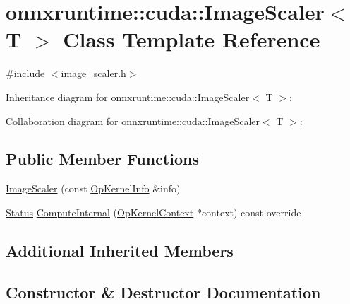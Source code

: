 \hypertarget{classonnxruntime_1_1cuda_1_1ImageScaler}{}\section{onnxruntime\+:\+:cuda\+:\+:Image\+Scaler$<$ T $>$ Class Template Reference}
\label{classonnxruntime_1_1cuda_1_1ImageScaler}


{\ttfamily \#include $<$image\+\_\+scaler.\+h$>$}



Inheritance diagram for onnxruntime\+:\+:cuda\+:\+:Image\+Scaler$<$ T $>$\+:


Collaboration diagram for onnxruntime\+:\+:cuda\+:\+:Image\+Scaler$<$ T $>$\+:
\subsection*{Public Member Functions}
\begin{DoxyCompactItemize}
\item 
\mbox{\hyperlink{classonnxruntime_1_1cuda_1_1ImageScaler_a042fd1ddeff0ce5c4e878e9deef8ff80}{Image\+Scaler}} (const \mbox{\hyperlink{classonnxruntime_1_1OpKernelInfo}{Op\+Kernel\+Info}} \&info)
\item 
\mbox{\hyperlink{classonnxruntime_1_1common_1_1Status}{Status}} \mbox{\hyperlink{classonnxruntime_1_1cuda_1_1ImageScaler_a151b80890690ab2caeb3285593a09e0e}{Compute\+Internal}} (\mbox{\hyperlink{classonnxruntime_1_1OpKernelContext}{Op\+Kernel\+Context}} $\ast$context) const override
\end{DoxyCompactItemize}
\subsection*{Additional Inherited Members}


\subsection{Constructor \& Destructor Documentation}
\mbox{\label{classonnxruntime_1_1cuda_1_1ImageScaler_a042fd1ddeff0ce5c4e878e9deef8ff80}} 

